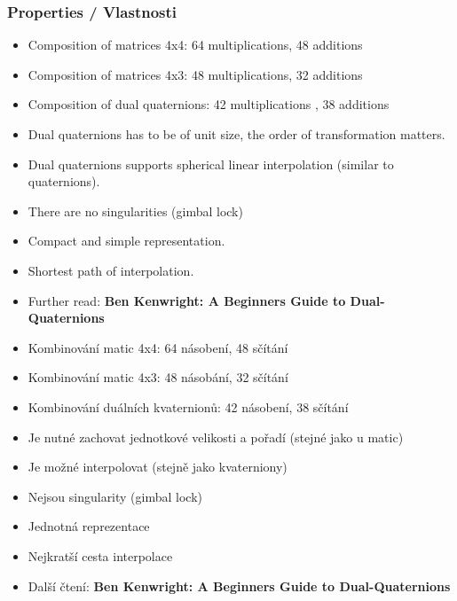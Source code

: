 \begin{frame}\frametitle{Properties / Vlastnosti}\scriptsize
	\begin{itemize}
  \item Composition of matrices 4x4: 64 multiplications, 48 additions
  \item Composition of matrices 4x3: 48 multiplications, 32 additions
  \item Composition of dual quaternions: 42 multiplications , 38 additions
  \item Dual quaternions has to be of unit size, the order of transformation matters.
  \item Dual quaternions supports spherical linear interpolation (similar to quaternions).
  \item There are no singularities (gimbal lock)
  \item Compact and simple representation.
  \item Shortest path of interpolation.
  \item Further read: \textbf{Ben Kenwright: A Beginners Guide to Dual-Quaternions}
	\end{itemize}

	\begin{itemize}
  \item Kombinování matic 4x4: 64 násobení, 48 sčítání
  \item Kombinování matic 4x3: 48 násobání, 32 sčítání
  \item Kombinování duálních kvaternionů: 42 násobení, 38 sčítání
  \item Je nutné zachovat jednotkové velikosti a pořadí (stejné jako u matic)
  \item Je možné interpolovat (stejně jako kvaterniony)
  \item Nejsou singularity (gimbal lock)
  \item Jednotná reprezentace
  \item Nejkratší cesta interpolace
  \item Další čtení: \textbf{Ben Kenwright: A Beginners Guide to Dual-Quaternions}
	\end{itemize}
\end{frame}
